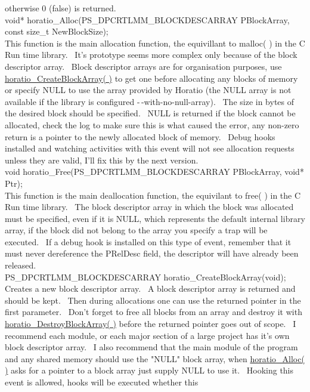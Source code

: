 \documentclass{article}
\begin{document}
otherwise
0 (false) is returned.
\\
void* horatio\_Alloc(PS\_DPCRTLMM\_BLOCKDESCARRAY
PBlockArray, const size\_t NewBlockSize);
\\
This function is the main allocation function, the equivillant to
malloc(
) in the C Run time library.~ It's prototype seems more complex
only
because of the block descriptor array.~ Block descriptor arrays
are
for organisation purposes, use \href{#CreateBlockArray}{horatio\_CreateBlockArray(
)} to get one before allocating any blocks of memory or specify NULL
to use the array provided by Horatio (the NULL array is not available
if the library is configured -$\,$-with-no-null-array).~ The size in
bytes of
the desired block should be specified.~ NULL is returned if the
block
cannot be allocated, check the log to make sure this is what caused the
error, any non-zero return is a pointer to the newly allocated block of
memory.~ Debug hooks installed and watching activities with this
event
will not see allocation requests unless they are valid, I'll fix this
by
the next version.
\\
void horatio\_Free(PS\_DPCRTLMM\_BLOCKDESCARRAY
PBlockArray, void* Ptr);
\\
This function is the main deallocation function, the equivilant to
free( ) in the C Run time library.~ The block descriptor array in
which the block was allocated must be specified, even if it is NULL,
which
represents the default internal library array, if the block did not
belong
to the array you specify a trap will be executed.~ If a debug hook
is installed on this type of event, remember that it must never
dereference
the PRelDesc field, the descriptor will have already been released.
\\
PS\_DPCRTLMM\_BLOCKDESCARRAY
horatio\_CreateBlockArray(void);
\\
Creates a new block descriptor array.~ A block descriptor array
is returned and should be kept.~ Then during allocations one can
use
the returned pointer in the first parameter.~ Don't forget to free
all blocks from an array and destroy it with \href{#DestroyBlockArray}{horatio\_DestroyBlockArray(
)} before the returned pointer goes out of scope.~ I recommend
each module, or each major section of a large project has it's own
block
descriptor array.~ I also recommend that the main module of the
program
and any shared memory should use the "NULL" block array, when \href{#Alloc}{horatio\_Alloc(
)} asks for a pointer to a block array just supply NULL to use
it.~
Hooking this event is allowed, hooks will be executed whether this
\end{document}
